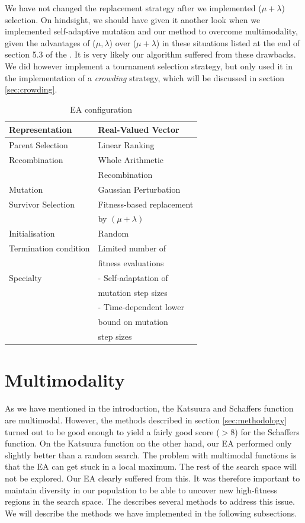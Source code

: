 We have not changed the replacement strategy after we
implemented ($\mu+\lambda$) selection. On hindsight,
we should have given it another look when we implemented self-adaptive mutation and our method to
overcome multimodality, given the advantages of ($\mu,\lambda$) over ($\mu+\lambda$) in these
situations listed at the end of section 5.3 of the \book. It is very likely our algorithm suffered
from these drawbacks. We did however implement a tournament selection strategy, but only used it in
the implementation of a \emph{crowding} strategy, which will be discussed in section
\ref{sec:crowding}.

\begin{table}[t]
\centering
\begin{tabular}{|l|l|}
\hline
Representation & Real-Valued Vector\\
\hline
Parent Selection & Linear Ranking\\
\hline
Recombination & Whole Arithmetic\\
& Recombination\\
\hline
Mutation & Gaussian Perturbation\\
\hline
Survivor Selection & Fitness-based replacement\\
& by $(\mu+\lambda)$\\
\hline
Initialisation & Random\\
\hline
Termination condition & Limited number of \\
&fitness evaluations\\
\hline
Specialty & - Self-adaptation of \\
& mutation step sizes\\
& - Time-dependent lower \\
& bound on mutation \\
&step sizes\\
\hline
\end{tabular}
\caption{EA configuration}\label{tab:configuration}
\end{table}

\section{Multimodality}\label{sec:multimodality}
As we have mentioned in the introduction, the Katsuura and Schaffers function are multimodal.
However, the methods described in section \ref{sec:methodology} turned out to be good enough to
yield a fairly good
score ($> 8$) for the Schaffers function. On the Katsuura function on the other hand, our EA
performed only slightly better than a random
search. The problem with multimodal functions is that the EA can get stuck
in a local maximum. The rest of the
search space will not be explored. Our EA clearly suffered from this. It was therefore important to
maintain diversity in our
population to be able to uncover new high-fitness regions in the search space. The \book describes
several methods to
address this issue. We will describe the methods we have implemented in the following subsections.

